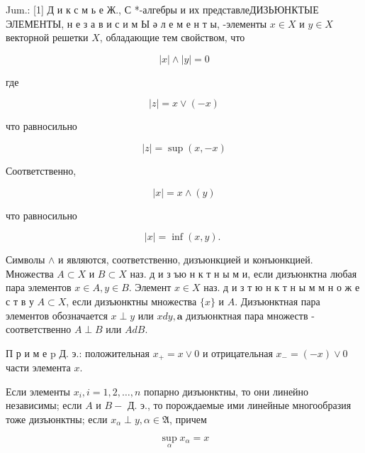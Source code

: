 \documentclass[10pt]{article}
\begin{document}
Jum.: [1] Д и к с м ь е Ж., С *-алгебры и их представлеДИЗЬЮНКТЫЕ ЭЛЕМЕНТЫ, н е з а в и с и м Ы ә л е м е н т ы, -элементы $x \in X$ и $y \in X$ векторной решетки $X$, обладающие тем свойством, что



\[

|x| \wedge|y|=0

\]



где



\[

|z|=x \vee(-x)

\]



что равносильно



\[

|z|=\sup (x,-x)

\]



Соответственно,



\[

|x|=x \wedge(y)

\]



что равносильно



\[

|x|=\inf (x, y) \text {. }

\]



Символы $\wedge$ и являются, соответственно, дизъюнкцией и конъюнкцией. Множества $A \subset X$ и $B \subset X$ наз. д и з ъю н к т н ы м и, если дизъюнктна любая пара элементов $x \in A, y \in B$. Элемент $x \in X$ наз. д и з т ю н к т н ы м м н о ж е с т в у $A \subset X$, если дизъюнктны множества $\{x\}$ и $A$. Дизъюнктная пара элементов обозначается $x \perp y$ или $x d y, \mathbf{a}$ дизъюнктная пара множеств - соответственно $A \perp B$ или $A d B$.



П р и м е $\mathrm{p}$ Д. э.: положительная $x_{+}=x \vee 0$ и отрицательная $x_{-}=(-x) \vee 0$ части элемента $x$.



Если элементы $x_{i}, i=1,2, \ldots, n$ попарно дизъюнктны, то они линейно независимы; если $A$ и $B-$ Д. э., то порождаемые ими линейные многообразия тоже дизъюнктны; если $x_{\alpha} \perp y, \alpha \in \mathfrak{A}$, причем



\[

\sup _{\alpha} x_{\alpha}=x

\]
\end{document}
